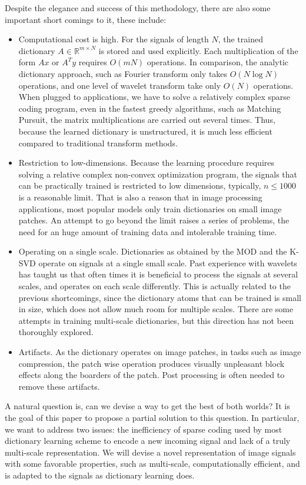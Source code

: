 \documentclass[a4paper]{article}
\begin{document}
Despite the elegance and success of this methodology, there are also some important short comings to it, these include:
\begin{itemize}
	\item Computational cost is high. For the signals of length $N$, the trained dictionary $A\in \mathbb{R}^{m\times N}$ is stored and used explicitly. Each multiplication of the form $Ax$ or $A^Ty$ requires $O(mN)$ operations. In comparison, the analytic dictionary approach, such as Fourier transform only takes $O(N\log N)$ operations, and one level of wavelet transform take only $O(N)$ operations. When plugged to applications, we have to solve a relatively complex sparse coding program, even in the fastest greedy algorithms, such as Matching Pursuit, the matrix multiplications are carried out several times. Thus, because the learned dictionary is unstructured, it is much less efficient compared to traditional transform methods.
	\item Restriction to low-dimensions. Because the learning procedure requires solving a relative complex non-convex optimization program, the signals that can be practically trained is restricted to low dimensions, typically, $n\leq 1000$ is a reasonable limit. That is also a reason that in image processing applications, most popular models only train dictionaries on small image patches. An attempt to go beyond the limit raises a series of problems, the need for an huge amount of training data and intolerable training time.
	\item Operating on a single scale. Dictionaries as obtained by the MOD and the K-SVD operate on signals at a single small scale. Past experience with wavelets has taught us that often times it is beneficial to process the signals at several scales, and operates on each scale differently. This is actually related to the previous shortcomings, since the dictionary atoms that can be trained is small in size, which does not allow much room for multiple scales. There are some attempts in training multi-scale dictionaries, but this direction has not been thoroughly explored.
	\item Artifacts. As the dictionary operates on image patches, in tasks such as image compression, the patch wise operation produces visually unpleasant block effects along the boarders of the patch. Post processing is often needed to remove these artifacts. 
\end{itemize}

A natural question is, can we devise a way to get the best of both worlds? It is the goal of this paper to propose a partial solution to this question. In particular, we want to address two issues: the inefficiency of sparse coding used by most dictionary learning scheme to encode a new incoming signal and lack of a truly multi-scale representation. We will devise a novel representation of image signals with some favorable properties, such as multi-scale, computationally efficient, and is adapted to the signals as dictionary learning does.
\end{document}
